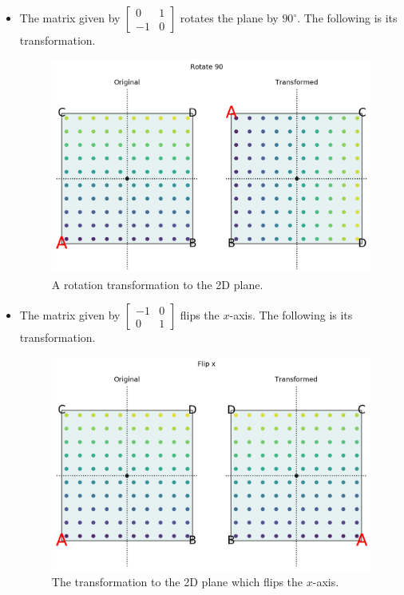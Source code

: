 \documentclass[a4paper, openany]{memoir}
\begin{document}
\begin{itemize}
        \item The matrix given by $\begin{bmatrix}
            0 & 1 \\
            -1 & 0
        \end{bmatrix}$ rotates the plane by $90^{\circ}$. The following is its transformation.
        \begin{figure}[H]
            \centering
            \includegraphics[scale=0.5]{src/3.13 Rot90.png}
            \caption{A rotation transformation to the 2D plane.}
        \end{figure}    

        \item The matrix given by $\begin{bmatrix}
            -1 & 0 \\
            0 & 1
        \end{bmatrix}$ flips the $x$-axis. The following is its transformation.
        \begin{figure}[H]
            \centering
            \includegraphics[scale=0.5]{src/3.14 FlipX.png}
            \caption{The transformation to the 2D plane which flips the $x$-axis.}
        \end{figure}    


\end{itemize}
\end{document}
